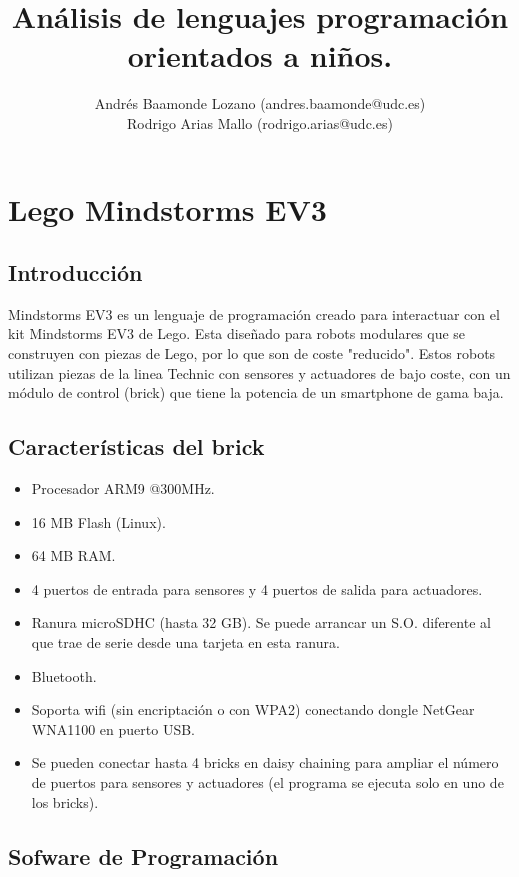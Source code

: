 \documentclass[12pt,a4paper]{article}
\title{Análisis de lenguajes programación orientados a niños.}
\author{Andrés Baamonde Lozano (andres.baamonde@udc.es)\\
	Rodrigo Arias Mallo (rodrigo.arias@udc.es)}
\begin{document}
\maketitle


\section{Lego Mindstorms EV3}

\subsection{Introducción}

Mindstorms EV3 es un lenguaje de programación creado para interactuar con el kit 
Mindstorms EV3 de Lego. Esta diseñado para robots modulares que se construyen 
con piezas de Lego, por lo que son de coste "reducido". Estos robots utilizan 
piezas de la linea Technic con sensores y actuadores de bajo coste, con un 
módulo de control (brick) que tiene la potencia de un smartphone de gama baja.

\subsection{Características del brick}

\begin{itemize}
\item Procesador ARM9 @300MHz.
\item 16 MB Flash (Linux).
\item 64 MB RAM.
\item 4 puertos de entrada para sensores y 4 puertos de salida para actuadores.
\item Ranura microSDHC (hasta 32 GB). Se puede arrancar un S.O. diferente al que
trae de serie desde una tarjeta en esta ranura.
\item Bluetooth.
\item Soporta wifi (sin encriptación o con WPA2) conectando dongle NetGear
WNA1100 en puerto USB.
\item Se pueden conectar hasta 4 bricks en daisy chaining para ampliar el número
de puertos para sensores y actuadores (el programa se ejecuta solo en uno de los
bricks).
\end{itemize}

\subsection{Sofware de Programación}
\end{document}
